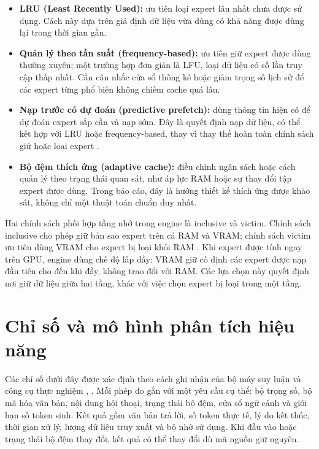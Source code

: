 \begin{itemize}
\item \textbf{LRU (Least Recently Used):} ưu tiên loại expert lâu nhất chưa được sử dụng. Cách này dựa trên giả định dữ liệu vừa dùng có khả năng được dùng lại trong thời gian gần.
\item \textbf{Quản lý theo tần suất (frequency-based):} ưu tiên giữ expert được dùng thường xuyên; một trường hợp đơn giản là LFU, loại dữ liệu có số lần truy cập thấp nhất. Cần cân nhắc cửa sổ thống kê hoặc giảm trọng số lịch sử để các expert từng phổ biến không chiếm cache quá lâu.
\item \textbf{Nạp trước có dự đoán (predictive prefetch):} dùng thông tin hiện có để dự đoán expert sắp cần và nạp sớm. Đây là quyết định nạp dữ liệu, có thể kết hợp với LRU hoặc frequency-based, thay vì thay thế hoàn toàn chính sách giữ hoặc loại expert \cite{moe_offloading}.
\item \textbf{Bộ đệm thích ứng (adaptive cache):} điều chỉnh ngân sách hoặc cách quản lý theo trạng thái quan sát, như áp lực RAM hoặc sự thay đổi tập expert được dùng. Trong báo cáo, đây là hướng thiết kế thích ứng được khảo sát, không chỉ một thuật toán chuẩn duy nhất.
\end{itemize}

Hai chính sách phối hợp tầng nhớ trong engine là inclusive và victim. Chính sách inclusive cho phép giữ bản sao expert trên cả RAM và VRAM; chính sách victim ưu tiên dùng VRAM cho expert bị loại khỏi RAM \cite{moe_tierengine_arch}. Khi expert được tính ngay trên GPU, engine dùng chế độ lấp đầy: VRAM giữ cố định các expert được nạp đầu tiên cho đến khi đầy, không trao đổi với RAM. Các lựa chọn này quyết định nơi giữ dữ liệu giữa hai tầng, khác với việc chọn expert bị loại trong một tầng.

\section{Chỉ số và mô hình phân tích hiệu năng}

Các chỉ số dưới đây được xác định theo cách ghi nhận của bộ máy suy luận và công cụ thực nghiệm \cite{moe_tierengine_arch}, \cite{exp_phase1_i5}. Mỗi phép đo gắn với một yêu cầu cụ thể: bộ trọng số, bộ mã hóa văn bản, nội dung hội thoại, trạng thái bộ đệm, cửa sổ ngữ cảnh và giới hạn số token sinh. Kết quả gồm văn bản trả lời, số token thực tế, lý do kết thúc, thời gian xử lý, lượng dữ liệu truy xuất và bộ nhớ sử dụng. Khi đầu vào hoặc trạng thái bộ đệm thay đổi, kết quả có thể thay đổi dù mã nguồn giữ nguyên.


